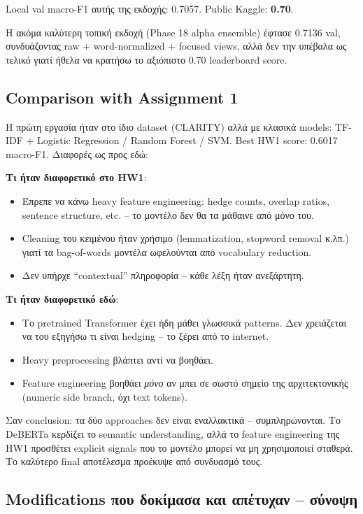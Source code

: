 \documentclass[12pt]{fphw}
\begin{document}
Local val macro-F1 αυτής της εκδοχής: 0.7057. Public Kaggle: \textbf{0.70}.

Η ακόμα καλύτερη τοπική εκδοχή (Phase 18 alpha ensemble) έφτασε 0.7136 val, συνδυάζοντας raw + word-normalized + focused views, αλλά δεν την υπέβαλα ως τελικό γιατί ήθελα να κρατήσω το αξιόπιστο 0.70 leaderboard score.

\subsection{Comparison with Assignment 1}

Η πρώτη εργασία ήταν στο ίδιο dataset (CLARITY) αλλά με κλασικά models: TF-IDF + Logistic Regression / Random Forest / SVM. Best HW1 score: 0.6017 macro-F1. Διαφορές ως προς εδώ:

\textbf{Τι ήταν διαφορετικό στο HW1}:
\begin{itemize}
    \item Έπρεπε να κάνω heavy feature engineering: hedge counts, overlap ratios, sentence structure, etc. -- το μοντέλο δεν θα τα μάθαινε από μόνο του.
    \item Cleaning του κειμένου ήταν χρήσιμο (lemmatization, stopword removal κ.λπ.) γιατί τα bag-of-words μοντέλα ωφελούνται από vocabulary reduction.
    \item Δεν υπήρχε ``contextual'' πληροφορία -- κάθε λέξη ήταν ανεξάρτητη.
\end{itemize}

\textbf{Τι ήταν διαφορετικό εδώ}:
\begin{itemize}
    \item Το pretrained Transformer έχει ήδη μάθει γλωσσικά patterns. Δεν χρειάζεται να του εξηγήσω τι είναι hedging -- το ξέρει από το internet.
    \item Heavy preprocessing βλάπτει αντί να βοηθάει.
    \item Feature engineering βοηθάει \emph{μόνο} αν μπει σε σωστό σημείο της αρχιτεκτονικής (numeric side branch, όχι text tokens).
\end{itemize}

Σαν conclusion: τα δύο approaches δεν είναι εναλλακτικά -- συμπληρώνονται. Το DeBERTa κερδίζει το semantic understanding, αλλά το feature engineering της HW1 προσθέτει explicit signals που το μοντέλο μπορεί να μη χρησιμοποιεί σταθερά. Το καλύτερο final αποτέλεσμα προέκυψε από συνδυασμό τους.

\subsection{Modifications που δοκίμασα και απέτυχαν -- σύνοψη}
\end{document}

